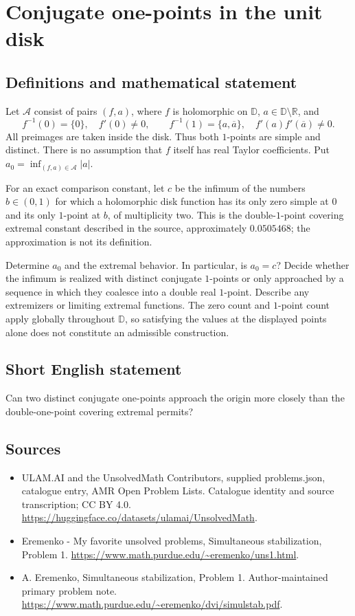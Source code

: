 \documentclass[11pt,a4paper]{article}
\begin{document}
\section*{Conjugate one-points in the unit disk}\label{statement}

\subsection{Definitions and mathematical statement}
Let $\mathcal A$ consist of pairs $(f,a)$,
where $f$ is holomorphic on $\mathbb D$,
$a\in\mathbb D\setminus\mathbb R$, and
\[
 f^{-1}(0)=\{0\},\quad f'(0)\ne0,\qquad
 f^{-1}(1)=\{a,\overline a\},\quad
 f'(a)f'(\overline a)\ne0.
\]
All preimages are taken inside the disk.
Thus both $1$-points are simple and distinct.
There is no assumption that $f$ itself has
real Taylor coefficients.
Put $a_0=\inf_{(f,a)\in\mathcal A}|a|$.

For an exact comparison constant, let $c$ be
the infimum of the numbers $b\in(0,1)$
for which a holomorphic disk function has
its only zero simple at $0$ and its
only $1$-point at $b$, of multiplicity two.
This is the double-$1$-point covering extremal
constant described in the source, approximately
$0.0505468$; the approximation is not its
definition.

Determine $a_0$ and the extremal behavior.
In particular, is $a_0=c$? Decide whether
the infimum is realized with distinct
conjugate $1$-points or only approached by
a sequence in which they coalesce into a
double real $1$-point. Describe any extremizers
or limiting extremal functions.
The zero count and $1$-point count apply
globally throughout $\mathbb D$, so satisfying
the values at the displayed points alone
does not constitute an admissible construction.
\subsection{Short English statement}
Can two distinct conjugate one-points approach the origin more closely than the double-one-point covering extremal permits?
\subsection{Sources}
\begin{itemize}
\item[S1] ULAM.AI and the UnsolvedMath Contributors, supplied problems.json, catalogue entry, AMR Open Problem Lists. Catalogue identity and source transcription; CC BY 4.0.
\url{https://huggingface.co/datasets/ulamai/UnsolvedMath}.
\item[S2] Eremenko - My favorite unsolved problems, Simultaneous stabilization, Problem 1. 
\url{https://www.math.purdue.edu/~eremenko/uns1.html}.
\item[S3] A. Eremenko, Simultaneous stabilization, Problem 1. Author-maintained primary problem note.
\url{https://www.math.purdue.edu/~eremenko/dvi/simulstab.pdf}.
\end{itemize}
\end{document}
